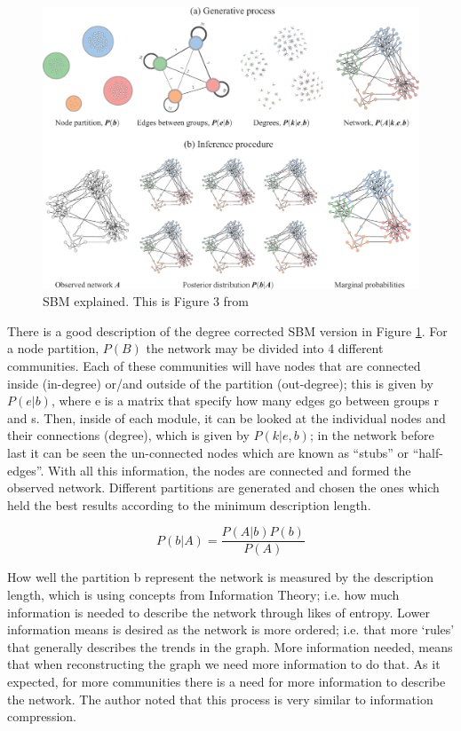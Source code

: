 \begin{figure}[!htb]    
    \centering
    \includegraphics[width=1.0\textwidth,height=1.0\textheight,keepaspectratio]{Sections/Network_I/Resources/dc-sbm_explained.png}
    \caption{SBM explained. This is Figure 3 from \citet{Peixoto2021-jx}}
    \label{fig:N_I:dc-sbm_explained}
\end{figure}

There is a good description of the degree corrected SBM version in Figure \ref{fig:N_I:dc-sbm_explained}. For a node partition, $P(B)$ the network may be divided into 4 different communities. Each of these communities will have nodes that are connected inside (in-degree) or/and outside of the partition (out-degree); this is given by $P(e|b)$, where e is a matrix that specify how many edges go between groups r and s. Then, inside of each module, it can be looked at the individual nodes and their connections (degree), which is given by $ P(k|e,b)$; in the network before last it can be seen the un-connected nodes which are known as “stubs” or “half-edges”. With all this information, the nodes are connected and formed the observed network. Different partitions are generated and chosen the ones which held the best results according to the minimum description length.

\begin{equation} \label{eq:sbm}
         P(b|A) = \frac{P(A|b)P(b)}{P(A)}
\end{equation}

How well the partition b represent the network is measured by the description length, which is using concepts from Information Theory; i.e. how much information is needed to describe the network through likes of entropy. Lower information means is desired as the network is more ordered; i.e. that more ‘rules’ that generally describes the trends in the graph. More information needed, means that  when reconstructing the graph we need more information to do that. As it expected, for more communities there is a need for more information to describe the network. The author noted that this process is very similar to information compression.

